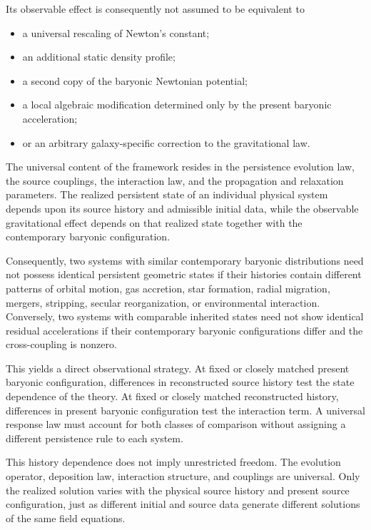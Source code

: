 Its observable effect is consequently not assumed to be equivalent to
\begin{itemize}
    \item a universal rescaling of Newton's constant;

    \item an additional static density profile;

    \item a second copy of the baryonic Newtonian potential;

    \item a local algebraic modification determined only by the present
    baryonic acceleration;

    \item or an arbitrary galaxy-specific correction to the gravitational law.
\end{itemize}

The universal content of the framework resides in the persistence evolution
law, the source couplings, the interaction law, and the propagation and
relaxation parameters. The realized persistent state of an individual physical
system depends upon its source history and admissible initial data, while the
observable gravitational effect depends on that realized state together with
the contemporary baryonic configuration.

Consequently, two systems with similar contemporary baryonic distributions need
not possess identical persistent geometric states if their histories contain
different patterns of orbital motion, gas accretion, star formation, radial
migration, mergers, stripping, secular reorganization, or environmental
interaction. Conversely, two systems with comparable inherited states need not
show identical residual accelerations if their contemporary baryonic
configurations differ and the cross-coupling is nonzero.

This yields a direct observational strategy. At fixed or closely matched present
baryonic configuration, differences in reconstructed source history test the
state dependence of the theory. At fixed or closely matched reconstructed
history, differences in present baryonic configuration test the interaction
term. A universal response law must account for both classes of comparison
without assigning a different persistence rule to each system.

This history dependence does not imply unrestricted freedom. The evolution
operator, deposition law, interaction structure, and couplings are universal.
Only the realized solution varies with the physical source history and present
source configuration, just as different initial and source data generate
different solutions of the same field equations.

